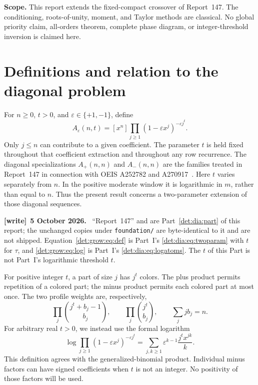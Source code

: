 \documentclass[11pt,letterpaper]{article}
\numberwithin{equation}{section}
\theoremstyle{definition}\newtheorem{definition}[theorem]{Definition}
\theoremstyle{remark}\newtheorem{remark}[theorem]{Remark}
\newcommand{\eps}{\varepsilon}
\newcommand{\file}[1]{\nolinkurl{#1}}
\newenvironment{writenote}[1][]{\par\smallskip\begingroup\small
 \noindent\textbf{[write]}\if\relax\detokenize{#1}\relax\else~\textbf{#1.}\fi\ }%
 {\par\endgroup\smallskip}
\begin{document}
\noindent\textbf{Scope.} This report extends the fixed-compact crossover of
Report~147. The conditioning, roots-of-unity, moment, and Taylor methods
are classical. No global priority claim, all-orders theorem, complete
phase diagram, or integer-threshold inversion is claimed here.
\medskip

\section{Definitions and relation to the diagonal problem}\label{det:grow:sec:definitions}
For $n\ge0$, $t>0$, and $\eps\in\{+1,-1\}$, define
\begin{equation}\label{det:grow:eq:def}
 A_\eps(n,t)=[x^n]\prod_{j\ge1}(1-\eps x^j)^{-\eps j^t}.
\end{equation}
Only $j\le n$ can contribute to a given coefficient. The parameter $t$
is held fixed throughout that coefficient extraction and throughout any
row recurrence. The diagonal specializations $A_+(n,n)$ and
$A_-(n,n)$ are the families treated in Report~147 in connection with OEIS
A252782 and A270917~\cite{foundation}. Here $t$ varies separately from
$n$. In the positive moderate window it is logarithmic in $m$, rather
than equal to $n$. Thus the present result concerns a two-parameter
extension of those diagonal sequences.
\begin{writenote}[5 October 2026]
``Report~147'' and \cite{foundation} are Part~\ref{det:dia:part} of this report; the unchanged copies under \file{foundation/} are byte-identical to it and are not shipped. Equation~\eqref{det:grow:eq:def} is Part~I's \eqref{det:dia:eq:twoparam} with $t$ for $\tau$, and \eqref{det:grow:eq:log} is Part~I's \eqref{det:dia:eq:logatoms}. The $t$ of this Part is not Part~I's logarithmic threshold $t$.
\end{writenote}

For positive integer $t$, a part of size $j$ has $j^t$ colors. The plus
product permits repetition of a colored part; the minus product permits
each colored part at most once. The two profile weights are, respectively,
\[
 \prod_j\binom{j^t+b_j-1}{b_j},\qquad
 \prod_j\binom{j^t}{b_j},\qquad \sum_jjb_j=n.
\]
For arbitrary real $t>0$, we instead use the formal logarithm
\begin{equation}\label{det:grow:eq:log}
 \log\prod_{j\ge1}(1-\eps x^j)^{-\eps j^t}
 =\sum_{j,k\ge1}\eps^{k-1}\frac{j^t x^{jk}}{k}.
\end{equation}
This definition agrees with the generalized-binomial product. Individual
minus factors can have signed coefficients when $t$ is not an integer.
No positivity of those factors will be used.
\end{document}
